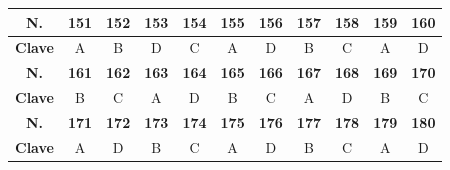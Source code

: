 \begin{center}
\begin{tabular}{|c|c|c|c|c|c|c|c|c|c|c|}
\hline
\textbf{N.} & \textbf{151} & \textbf{152} & \textbf{153} & \textbf{154} & \textbf{155} & \textbf{156} & \textbf{157} & \textbf{158} & \textbf{159} & \textbf{160} \\
\hline
\textbf{Clave} & A & B & D & C & A & D & B & C & A & D \\
\hline
\textbf{N.} & \textbf{161} & \textbf{162} & \textbf{163} & \textbf{164} & \textbf{165} & \textbf{166} & \textbf{167} & \textbf{168} & \textbf{169} & \textbf{170} \\
\hline
\textbf{Clave} & B & C & A & D & B & C & A & D & B & C \\
\hline
\textbf{N.} & \textbf{171} & \textbf{172} & \textbf{173} & \textbf{174} & \textbf{175} & \textbf{176} & \textbf{177} & \textbf{178} & \textbf{179} & \textbf{180} \\
\hline
\textbf{Clave} & A & D & B & C & A & D & B & C & A & D \\
\hline
\end{tabular}
\end{center}

